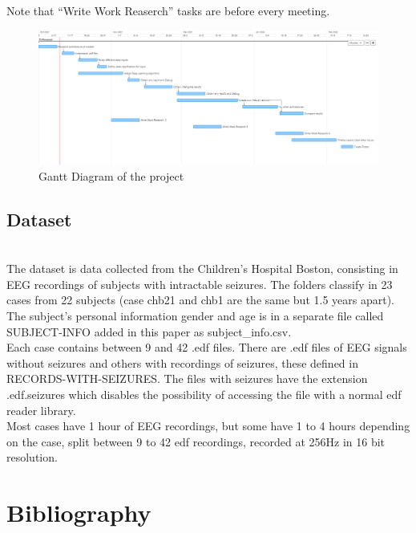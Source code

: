 ﻿\documentclass[10pt,a4paper,twocolumn,twoside]{article}
\begin{document}
Note that “Write Work Reaserch” tasks are before every meeting.
\leavevmode\\

\begin{figure}[!h]
  \centering
    \includegraphics[width=1\textwidth]{img/Gantt.png}
    \caption{Gantt Diagram of the project}
    \label{fig-exemple}
  \end{figure}

\subsection{Dataset}
\leavevmode\\
The dataset is data collected from the Children’s Hospital Boston, consisting in EEG recordings of subjects with intractable seizures. The folders classify in 23 cases from 22 subjects (case chb21 and chb1 are the same but 1.5 years apart). The subject’s personal information gender and age is in a separate file called SUBJECT-INFO added in this paper as subject\_info.csv.
\\
Each case contains between 9 and 42 .edf files. There are .edf files of EEG signals without seizures and others with recordings of seizures, these defined in RECORDS-WITH-SEIZURES. The files with seizures have the extension .edf.seizures which disables the possibility of accessing the file with a normal edf reader library.
\\
Most cases have 1 hour of EEG recordings, but some have 1 to 4 hours depending on the case, split between 9 to 42 edf recordings, recorded at 256Hz in 16 bit resolution.
\\





\section{Bibliography}
\label{sec-bibliography}


\end{document}

